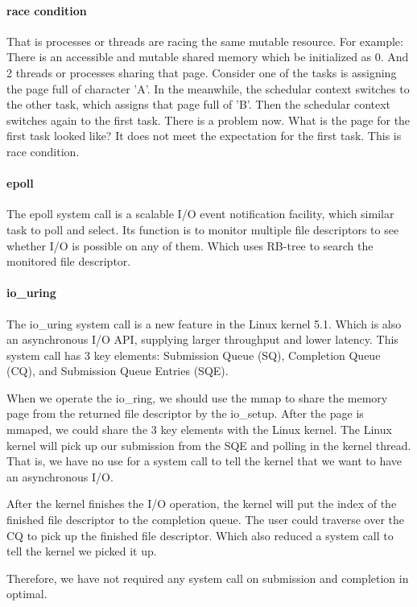 \documentclass[12pt,a4paper]{article}
\begin{document}
\paragraph{race condition}
That is processes or threads are racing the same mutable resource. For example:
There is an accessible and mutable shared memory which be initialized as 0. And
2 threads or processes sharing that page. Consider one of the tasks is assigning
the page full of character 'A'. In the meanwhile, the schedular context switches to
the other task, which assigns that page full of 'B'. Then the schedular context switches
again to the first task. There is a problem now. What is the page for the first
task looked like? It does not meet the expectation for the first task.
This is race condition.

\paragraph{epoll}
The epoll system call is a scalable I/O event notification facility, which similar
task to poll and select. Its function is to monitor multiple file descriptors to
see whether I/O is possible on any of them. Which uses RB-tree to search the monitored
file descriptor.

\paragraph{io\_uring}
The io\_uring system call is a new feature in the Linux kernel 5.1. Which is also an
asynchronous I/O API, supplying larger throughput and lower latency. This system call
has 3 key elements: Submission Queue (SQ), Completion Queue (CQ), and Submission Queue
Entries (SQE).

When we operate the io\_ring, we should use the mmap to share the memory page from
the returned file descriptor by the io\_setup. After the page is mmaped, we could share
the 3 key elements with the Linux kernel. The Linux kernel will pick up our submission
from the SQE and polling in the kernel thread. That is, we have no use for a system call
to tell the kernel that we want to have an asynchronous I/O.

After the kernel finishes the I/O operation, the kernel will put the index of the finished
file descriptor to the completion queue. The user could traverse over the CQ to pick up
the finished file descriptor. Which also reduced a system call to tell the kernel we picked
it up.

Therefore, we have not required any system call on submission and completion in optimal.
\end{document}
